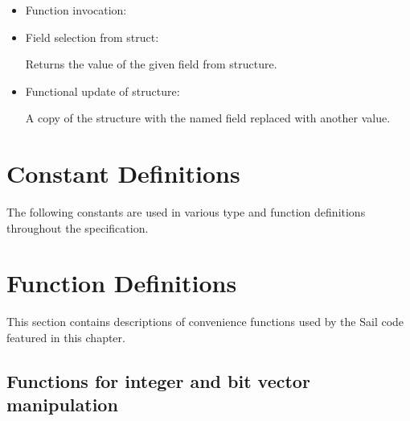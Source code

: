 \begin{itemize}
\item Function invocation:


\item Field selection from struct:


Returns the value of the given field from structure.

\item Functional update of structure:


A copy of the structure with the named field replaced with another value.

\end{itemize}

\section{Constant Definitions}
The following constants are used in various type and function definitions throughout the specification.

\medskip
\label{sailRISCVzxlen}
\sailRISCVtypecapAddrWidth{}
\sailRISCVtypecapLenWidth{}
\sailRISCVtypecapSizze{}
\sailRISCVtypecapMantissaWidth{}


\section{Function Definitions}

This section contains descriptions of convenience functions used by the Sail code featured in this chapter.

\subsection*{Functions for integer and bit vector manipulation}

